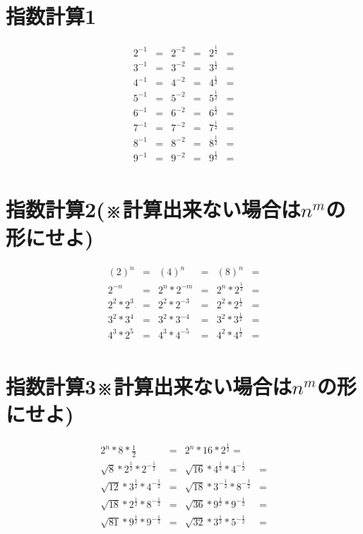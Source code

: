 \documentclass[paper=b4j,landscape,twocolumn,fleqn]{jlreq}
\begin{document}
\section{指数計算1}
\begin{align*}
  2^{-1}&= & 2^{-2}&= & 2^{\frac{1}{2}}&=\\
  3^{-1}&= & 3^{-2}&= & 3^{\frac{1}{2}}&=\\
  4^{-1}&= & 4^{-2}&= & 4^{\frac{1}{2}}&=\\
  5^{-1}&= & 5^{-2}&= & 5^{\frac{1}{2}}&=\\
  6^{-1}&= & 6^{-2}&= & 6^{\frac{1}{2}}&=\\
  7^{-1}&= & 7^{-2}&= & 7^{\frac{1}{2}}&=\\
  8^{-1}&= & 8^{-2}&= & 8^{\frac{1}{2}}&=\\
  9^{-1}&= & 9^{-2}&= & 9^{\frac{1}{2}}&=\\
\end{align*}
\section{指数計算2(※計算出来ない場合は$n^m$の形にせよ)}
\begin{align*}
  (2)^n&= & (4)^n&= & (8)^n&=\\
  2^{-n}&= & 2^n*2^{-m}&= & 2^n * 2^{\frac{1}{2}}&=\\
  2^2*2^3&= & 2^2*2^{-3}&= & 2^2*2^{\frac{1}{2}}&=\\
  3^2*3^4&= & 3^2*3^{-4}&= & 3^2*3^{\frac{1}{2}}&=\\
  4^3*2^5&= & 4^3*4^{-5}&= & 4^2*4^{\frac{1}{2}}&=\\
\end{align*}
\section{指数計算3※計算出来ない場合は$n^m$の形にせよ)}
\begin{align*}
  2^n*8*\frac{1}{2} &= & 2^{n}*16*2^{\frac{1}{2}}= \\
  \sqrt{8}*2^{\frac{1}{2}}*2^{-\frac{1}{2}} &= & \sqrt{16}*4^{\frac{1}{2}}*4^{-\frac{1}{2}}&= \\
  \sqrt{12}*3^{\frac{1}{2}}*4^{-\frac{1}{2}} &= & \sqrt{18}*3^{-\frac{1}{2}}*8^{-\frac{1}{2}}&= \\
  \sqrt{18}*2^{\frac{1}{2}}*8^{-\frac{1}{2}} &= & \sqrt{36}*9^{\frac{1}{2}}*9^{-\frac{1}{2}}&= \\
  \sqrt{81}*9^{\frac{1}{2}}*9^{-\frac{1}{2}} &= & \sqrt{32}*3^{\frac{1}{2}}*5^{-\frac{1}{2}}&= \\
\end{align*}
\end{document}
